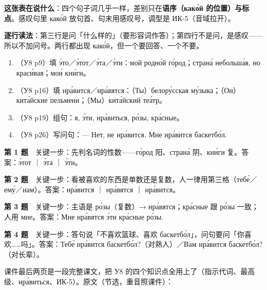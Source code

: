 \textbf{这张表在说什么}：四个句子词几乎一样，差别只在\textbf{语序（како́й 的位置）与标点}。感叹句里 како́й 放句首、句末用感叹号，调型是 ИК-5（音域拉开）。

\textbf{逐行读法}：第三行是问「什么样的」（要形容词作答）；第四行不是问，是感叹——所以不加问号。两行都出现 како́й，但一个要回答、一个不要。


\begin{enumerate}[label=\textbf{第 \arabic* 题}]
\item （У8 p9）填 э́то／э́тот／э́та／э́ти：\blank мой родно́й го́род；\blank страна́ небольша́я, но краси́вая；\blank мои́ кни́ги。
\item （У8 p16）填 нра́вится／нра́вятся：（Ты）\blank белору́сская му́зыка；（Он）\blank кита́йские пельмени；（Мы）\blank кита́йский теа́тр。
\item （У8 p19）组句：я, э́ти, нра́виться, ро́зы, кра́сные。
\item （У8 p26）写问句：— Нет, не нра́вится. Мне нра́вится баскетбо́л.
\end{enumerate}

\textbf{第 1 题}　关键一步：先判名词的性数——го́род 阳、страна́ 阴、кни́ги 复。答案：э́тот ｜ э́та ｜ э́ти。

\textbf{第 2 题}　关键一步：看被喜欢的东西是单数还是复数，人一律用第三格（тебе́／ему́／нам）。答案：нра́вится ｜ нра́вятся ｜ нра́вится。

\textbf{第 3 题}　关键一步：主语是 ро́зы（复数）→ нра́вятся；кра́сные 跟 ро́зы 一致；人用 мне。答案：Мне нра́вятся э́ти кра́сные ро́зы.

\textbf{第 4 题}　关键一步：答句说「不喜欢篮球、喜欢 баскетбо́л」，问句要问「你喜欢……吗」。答案：Тебе́ нра́вится баскетбо́л?（对熟人）／Вам нра́вится баскетбо́л?（对长辈）。


课件最后两页是一段完整课文，把 У8 的四个知识点全用上了（指示代词、最高级、нра́виться、ИК-5）。原文（节选，重音照课件）：


